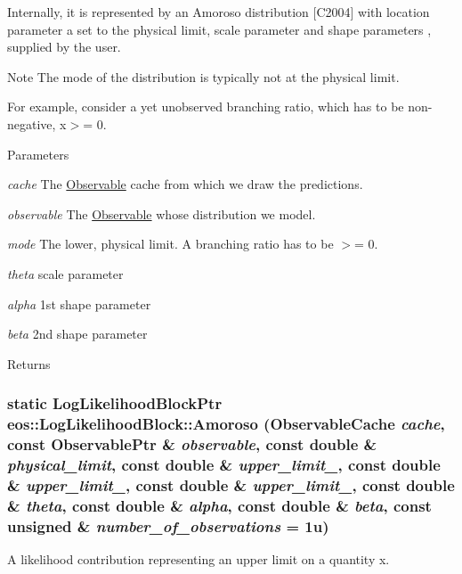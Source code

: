 Internally, it is represented by an Amoroso distribution \mbox{[}C2004\mbox{]} with location parameter a set to the physical limit, scale parameter  and shape parameters ,  supplied by the user.

\begin{DoxyNote}{Note}
The mode of the distribution is typically not at the physical limit.
\end{DoxyNote}
For example, consider a yet unobserved branching ratio, which has to be non-\/negative, x$>$= 0.


\begin{DoxyParams}{Parameters}
\item[{\em cache}]The \hyperlink{classeos_1_1Observable}{Observable} cache from which we draw the predictions. \item[{\em observable}]The \hyperlink{classeos_1_1Observable}{Observable} whose distribution we model. \item[{\em mode}]The lower, physical limit. A branching ratio has to be $>$= 0. \item[{\em theta}]scale parameter \item[{\em alpha}]1st shape parameter \item[{\em beta}]2nd shape parameter \end{DoxyParams}
\begin{DoxyReturn}{Returns}

\end{DoxyReturn}
\hypertarget{classeos_1_1LogLikelihoodBlock_acdc69e205b9a51fb238833bda103c2f7}{
\subsubsection[{Amoroso}]{\setlength{\rightskip}{0pt plus 5cm}static {\bf LogLikelihoodBlockPtr} eos::LogLikelihoodBlock::Amoroso ({\bf ObservableCache} {\em cache}, \/  const {\bf ObservablePtr} \& {\em observable}, \/  const double \& {\em physical\_\-limit}, \/  const double \& {\em upper\_\-limit\_}, \/  const double \& {\em upper\_\-limit\_}, \/  const double \& {\em upper\_\-limit\_}, \/  const double \& {\em theta}, \/  const double \& {\em alpha}, \/  const double \& {\em beta}, \/  const unsigned \& {\em number\_\-of\_\-observations} = {\ttfamily 1u})}}
\label{classeos_1_1LogLikelihoodBlock_acdc69e205b9a51fb238833bda103c2f7}
A likelihood contribution representing an upper limit on a quantity x.

